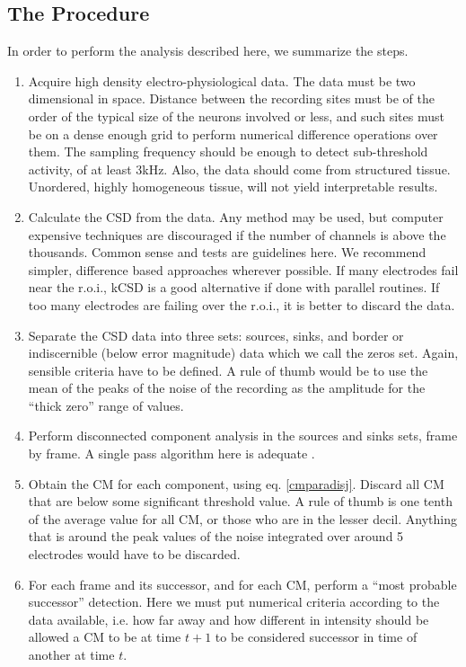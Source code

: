 \documentclass[11pt, letterpaper]{article}
\begin{document}
 \subsection{The Procedure}
 
 In order to perform the analysis described here, we summarize the steps.
 \begin{enumerate}
 \item Acquire high density electro-physiological data. The data must be two
   dimensional
   in space. Distance between the recording sites must be of the order of the typical
   size of the neurons involved or less, and such sites must be on a dense enough grid to perform numerical difference operations over them.
   The sampling frequency should be enough to detect sub-threshold activity,
   of at least 3kHz. Also, the data should come from structured tissue.
   Unordered, highly homogeneous tissue, will not yield interpretable results. 
 \item Calculate the CSD from the data. Any method may be used,
   but computer expensive techniques are discouraged if the
   number of channels is above the thousands.
   Common sense and tests are guidelines here.
   We recommend simpler, difference based approaches wherever possible.
   If many electrodes fail near the r.o.i.,
   kCSD is a good alternative if done with
   parallel routines.
   If too many electrodes are failing over the r.o.i.,
   it is better to discard the data. 
 \item Separate the CSD data into three sets: sources, sinks, and border or indiscernible (below error magnitude) data
   which we call the zeros set. Again, sensible criteria have to be defined.
   A rule of thumb would be to use the mean of the peaks of the noise  of the recording as the amplitude for the ``thick zero'' range of values. 
\item Perform disconnected component analysis in the sources and sinks sets, frame by frame.
  A single pass algorithm here is  adequate \cite{Vincent91, Abubaker07}.
\item  Obtain the CM for each component, using eq. \ref{cmparadisj}. Discard
  all CM that are below some significant threshold value. A rule of thumb is one tenth of the average value for all CM,
  or those who are in the lesser decil. Anything that is around the peak
  values of the noise integrated over around 5 electrodes would have to be discarded.
\item For each frame and its successor, and for each CM, perform a ``most probable successor'' detection. Here we must put numerical criteria according to the data available, i.e. how far away and how different in intensity should be allowed a CM to be at time $t+1$ to be considered successor in time of another at time $t$.

\end{enumerate}
\end{document}
